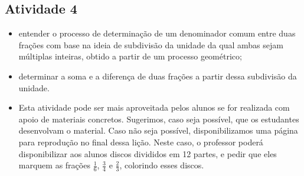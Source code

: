 \begin{multicols}{2}
\subsection{Atividade 4}

\newline \vspace{.15cm}

\begin{itemize} %
  \item      entender o processo de determinação de um denominador comum entre duas frações com base na ideia de subdivisão da unidade da qual ambas sejam múltiplas inteiras, obtido a partir de um processo geométrico;
  \item      determinar a soma e a diferença de duas frações a partir dessa subdivisão da unidade.
\end{itemize} %

\pagebreak

 \vspace{.15cm}

\begin{itemize} %
  \item      Esta atividade pode ser mais aproveitada pelos alunos se for realizada com apoio de materiais concretos. Sugerimos, caso seja possível, que os estudantes desenvolvam o material. Caso não seja possível, disponibilizamos uma página para reprodução no final dessa lição. Neste caso, o professor poderá disponibilizar aos alunos discos divididos em 12 partes, e pedir que eles marquem as frações     $\frac{1}{6}$,     $\frac{3}{4}$     e     $\frac{2}{3}$,     colorindo esses discos.



\end{itemize}
\end{multicols}
